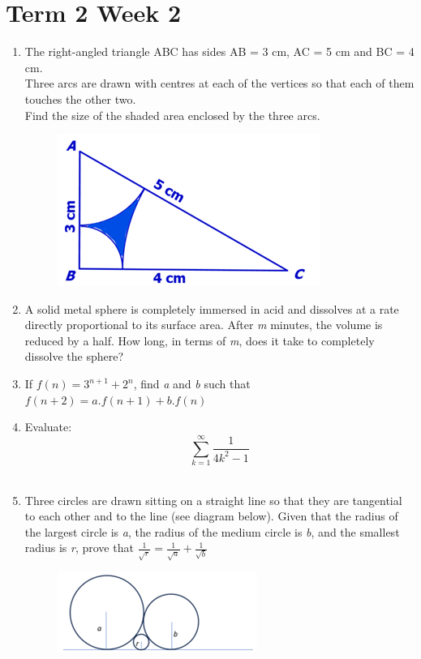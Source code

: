 \documentclass[../main.tex]{subfiles}
\begin{document}
\section*{Term 2 Week 2}
\begin{enumerate}
    \item 
    The right-angled triangle ABC has sides AB = 3 cm, AC = 5 cm and BC = 4 cm.\\
    
    Three arcs are drawn with centres at each of the vertices so that each of them touches the other two.\\
    
    Find the size of the shaded area enclosed by the three arcs.\\
    \begin{figure}[h]
        \centering
        \includegraphics{images/t2w2q1.png}
    \end{figure}

    \item 
    A solid metal sphere is completely immersed in acid and dissolves at a rate directly proportional to its surface area. After \textit{m} minutes, the volume is reduced by a half. How long, in terms of \textit{m}, does it take to completely dissolve the sphere?\\

    \item 
    If \(f(n)=3^{n+1}+2^n\), find \textit{a} and \textit{b} such that \(f(n+2)=a.f(n+1)+b.f(n)\)\\

    \item 
    Evaluate:\\
    \[\sum_{k=1}^\infty \frac{1}{4k^2-1}\]\\

    \item 
    Three circles are drawn sitting on a straight line so that they are tangential to each other and to the line (see diagram below). Given that the radius of the largest circle is \textit{a}, the radius of the medium circle is \textit{b}, and the smallest radius is \textit{r}, prove that \(\frac{1}{\sqrt{r}}=\frac{1}{\sqrt{a}}+\frac{1}{\sqrt{b}}\)\\
    \begin{figure}[H]
        \centering
        \includegraphics{images/t2w2q5.png}
    \end{figure}
    
    
\end{enumerate}
\end{document}
